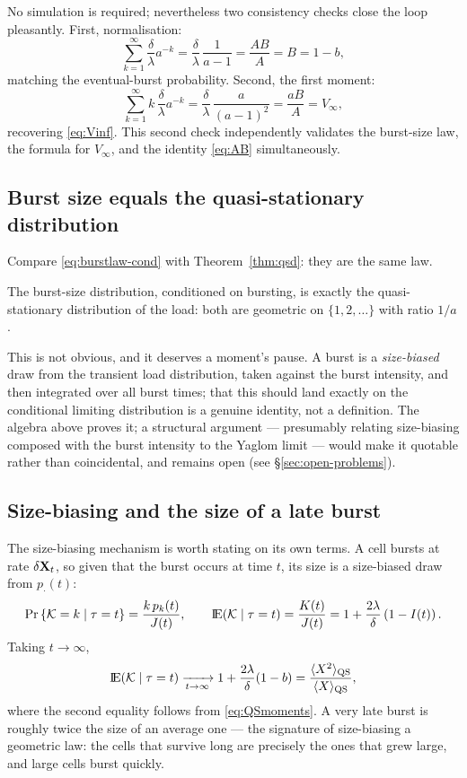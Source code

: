 No simulation is required; nevertheless two consistency checks close the
loop pleasantly. First, normalisation:
$$
\sum_{k=1}^{\infty}\frac{\delta}{\lambda}a^{-k}
=\frac{\delta}{\lambda}\,\frac{1}{a-1}
=\frac{AB}{A}=B=1-b,
$$
matching the eventual-burst probability. Second, the first moment:
$$
\sum_{k=1}^{\infty}k\,\frac{\delta}{\lambda}a^{-k}
=\frac{\delta}{\lambda}\,\frac{a}{(a-1)^2}
=\frac{aB}{A}=V_\infty,
$$
recovering \eqref{eq:Vinf}. This second check independently validates the
burst-size law, the formula for $V_\infty$, and the identity
\eqref{eq:AB} simultaneously.

\subsection{Burst size equals the quasi-stationary distribution}
\label{sec:burst=qsd}

Compare \eqref{eq:burstlaw-cond} with Theorem~\ref{thm:qsd}: they are the
same law.

\begin{corollary}[Burst size $=$ QSD]
\label{cor:burst-qsd}
The burst-size distribution, conditioned on bursting, is exactly the
quasi-stationary distribution of the load: both are geometric on
$\{1,2,\ldots\}$ with ratio $1/a$.
\end{corollary}

This is not obvious, and it deserves a moment's pause. A burst is a
\emph{size-biased} draw from the transient load distribution, taken against
the burst intensity, and then integrated over all burst times; that this
should land exactly on the conditional limiting distribution is a genuine
identity, not a definition. The algebra above proves it; a structural
argument --- presumably relating size-biasing composed with the burst
intensity to the Yaglom limit \cite{yaglom1947certain} --- would make it
quotable rather than coincidental, and remains open
(see \S\ref{sec:open-problems}).

\subsection{Size-biasing and the size of a late burst}
\label{sec:size-bias}

The size-biasing mechanism is worth stating on its own terms. A cell bursts
at rate $\delta{{\bf X}_t}$, so given that the burst occurs at time $t$, its size is
a size-biased draw from $p_\cdot(t)$:
\begin{equation}
{\text{Pr}\left\{\mathcal{K}=k\mid\tau=t\right\}}=\frac{k\,p_k(t)}{J(t)},
\qquad
{\rm I}\!{\rm E}(\mathcal{K}\mid\tau=t)=\frac{K(t)}{J(t)}
=1+\frac{2\lambda}{\delta}\left(1-I(t)\right).
\label{eq:sizebias}
\end{equation}
Taking $t\to\infty$,
\begin{equation}
{\rm I}\!{\rm E}(\mathcal{K}\mid\tau=t)\xrightarrow[t\to\infty]{}
1+\frac{2\lambda}{\delta}(1-b)
=\frac{\langle X^2\rangle_{\rm QS}}{\langle X\rangle_{\rm QS}},
\end{equation}
where the second equality follows from \eqref{eq:QSmoments}. A very late
burst is roughly twice the size of an average one --- the signature of
size-biasing a geometric law: the cells that survive long are precisely the
ones that grew large, and large cells burst quickly.

